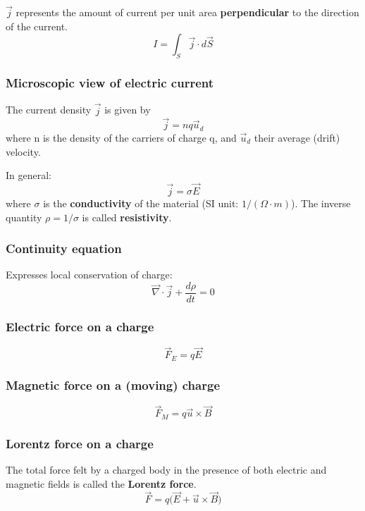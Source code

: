 \documentclass[english,11pt]{article}
\begin{document}
$\vec{j}$ represents the amount of current per unit area {\bf perpendicular} to the direction of the current.
\begin{equation*}
  I = \int_{S} \vec{j} \cdot d\vec{S}
\end{equation*}

\subsubsection*{\bf Microscopic view of electric current}

The current density $\vec{j}$ is given by
\begin{equation*}
  \vec{j} = n q \vec{u}_{d}
\end{equation*}
where n is the density of the carriers of charge q, and $\vec{u}_{d}$ their average (drift) velocity.

In general:
\begin{equation*}
  \vec{j} = \sigma \vec{E}
\end{equation*}
where $\sigma$ is the {\bf conductivity} of the material (SI unit: $1/(\Omega \cdot m)$).
The inverse quantity $\rho = 1/\sigma$ is called {\bf resistivity}.

\subsubsection*{\bf Continuity equation}

Expresses local conservation of charge:
\begin{equation*}
    \vec{\nabla} \cdot \vec{j} +\frac{d\rho}{dt} = 0
\end{equation*}


\subsubsection*{\bf Electric force on a charge}
\begin{equation*}
  \vec{F}_{E} = q \vec{E}
\end{equation*}

\subsubsection*{\bf Magnetic force on a (moving) charge}
\begin{equation*}
  \vec{F}_{M} = q \vec{u} \times \vec{B}
\end{equation*}

\subsubsection*{\bf Lorentz force on a charge}
The total force felt by a charged body in the presence of
both electric and magnetic fields is called the {\bf Lorentz force}.
\begin{equation*}
  \vec{F} = q \Big( \vec{E} + \vec{u} \times \vec{B} \Big)
\end{equation*}
\end{document}
